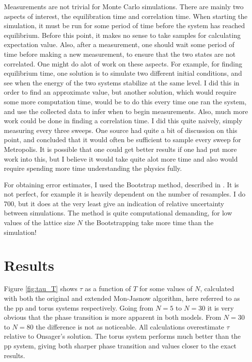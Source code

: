 \documentclass[12pt, a4paper]{article}
\begin{document}
Measurements are not trivial for Monte Carlo simulations.
There are mainly two aspects of interest, the equilibration time and correlation time.
When starting the simulation, it must be run for some period of time before the system has reached equilibrium.
Before this point, it makes no sense to take samples for calculating expectation value.
Also, after a measurement, one should wait some period of time before making a new measurement, to ensure that the two states are not correlated.
One might do alot of work on these aspects.
For example, for finding equilibrium time, one solution is to simulate two different initial conditions, and see when the energy of the two systems stabilize at the same level.
I did this in order to find an approximate value, but another solution, which would require some more computation time, would be to do this every time one ran the system, and use the collected data to infer when to begin measurements.
Also, much more work could be done in finding a correlation time.
I did this quite naively, simply measuring every three sweeps.
One source\cite{niels} had quite a bit of discussion on this point, and concluded that it would often be sufficient to sample every sweep for Metropolis.
It is possible that one could get better results if one had put more work into this, but I believe it would take quite alot more time and also would require spending more time understanding the physics fully.

For obtaining error estimates, I used the Bootstrap method, described in \cite{niels}.
It is not perfect, for example it is heavily dependent on the number of resamples.
I do 700, but it does at the very least give an indication of relative uncertainty between simulations.
The method is quite computational demanding, for low values of the lattice size $N$ the Bootstrapping take more time than the simulation!

\section{Results}
Figure \ref{fig:tau_T} shows $\tau$ as a function of $T$ for some values of $N$, calculated with both the original and extended Mon-Jasnow algorithm, here referred to as the pp and torus systems respectively.
Going from $N=5$ to $N=30$ it is very obvious that the phase transition is more apparent in both models.
From $N=30$ to $N=80$ the difference is not as noticeable.
All calculations overestimate $\tau$ relative to Onsager's solution.
The torus system performs much better than the pp system, giving both sharper phase transition and values closer to the exact results.
\end{document}

